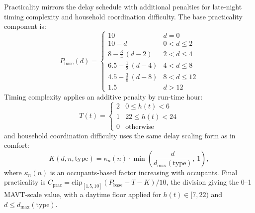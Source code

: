 \documentclass[final,3p,times]{elsarticle}
\begin{document}
Practicality mirrors the delay schedule with additional penalties for late-night timing complexity and household coordination difficulty. The base practicality component is:
\begin{equation}
  P_{\mathrm{base}}(d)=
  \begin{cases}
    10                                  & d=0 \\[3pt]
    10-d                                & 0<d\le 2 \\[3pt]
    8-\frac{3}{4}\,(d-2)                & 2<d\le 4 \\[3pt]
    6.5-\frac{1}{2}\,(d-4)              & 4<d\le 8 \\[3pt]
    4.5-\frac{3}{8}\,(d-8)              & 8<d\le 12 \\[3pt]
    1.5                                 & d>12
  \end{cases}
  \label{eq:appliance_base_practicality}
\end{equation}
\noindent Timing complexity applies an additive penalty by run-time hour:
\begin{equation}
  T(t)=
  \begin{cases}
    2 & 0\le h(t)<6 \\[3pt]
    1 & 22\le h(t)<24 \\[3pt]
    0 & \text{otherwise}
  \end{cases}
  \label{eq:appliance_timing_penalty}
\end{equation}
\noindent and household coordination difficulty uses the same delay scaling form as in comfort:
\begin{equation}
  K(d,n,\mathrm{type})=\kappa_n(n)\cdot \min\!\left(\frac{d}{d_{\max}(\mathrm{type})},\,1\right),
  \label{eq:appliance_coordination_penalty}
\end{equation}
\noindent where $\kappa_n(n)$ is an occupants-based factor increasing with occupants. Final practicality is $C_{\mathrm{prac}}=\mathrm{clip}_{[1.5,10]}(P_{\mathrm{base}}-T-K)/10$, the division giving the 0--1 MAVT-scale value, with a daytime floor applied for $h(t)\in[7,22)$ and $d\le d_{\max}(\mathrm{type})$.
\end{document}
